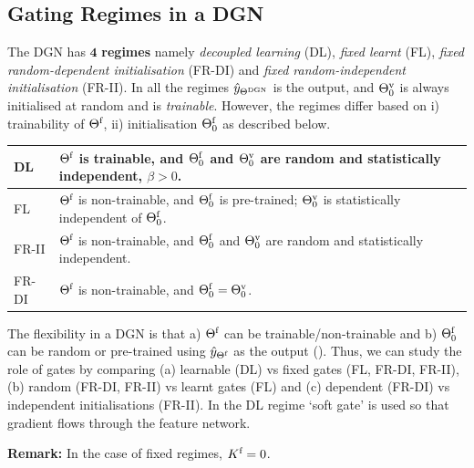 \subsection{Gating Regimes in a DGN}
\begin{definition}\label{def:regime}The DGN has $\mathbf{4}$ \textbf{regimes} namely \emph{decoupled learning} (DL), \emph{fixed learnt} (FL), \emph{fixed random-dependent initialisation} (FR-DI) and \emph{fixed random-independent initialisation} (FR-II). 
In all the regimes $\hat{y}_{\Theta^{\text{DGN}}}$ is the output, and ${\Theta}^{\text{v}}_0$ is always initialised at random and is \emph{trainable}. However, the regimes differ based on i) trainability of $\Theta^{\textrm{f}}$, ii) initialisation $\Theta^{\textrm{f}}_0$ as described below.\\
\begin{tabular}{|l|p{6cm}|}\hline
DL               & $\Theta^{\textrm{f}}$ is trainable, and $\Theta^{\textrm{f}}_0$ and ${\Theta}^{\text{v}}_0$ are random and statistically independent,  $\beta>0$.\\\hline
FL               & $\Theta^{\textrm{f}}$ is non-trainable, and $\Theta^{\textrm{f}}_0$ is pre-trained;  ${\Theta}^{\text{v}}_0$ is statistically independent of $\Theta^{\textrm{f}}_0$. \\\hline
FR-II            & $\Theta^{\textrm{f}}$ is non-trainable, and $\Theta^{\textrm{f}}_0$ and ${\Theta}^{\text{v}}_0$ are random and statistically independent.\\\hline
FR-DI   &  $\Theta^{\textrm{f}}$ is non-trainable, and $\Theta^{\textrm{f}}_0={\Theta}^{\text{v}}_0$.\\\hline
\end{tabular}
\end{definition}
The flexibility in a DGN is that  a) $\Theta^{\textrm{f}}$ can be trainable/non-trainable and b) $\Theta^{\textrm{f}}_0$ can be random or pre-trained using $\hat{y}_{{\Theta}^{\text{f}}}$ as the output (). Thus, we can study the role of gates by comparing (a) learnable (DL) vs fixed gates (FL, FR-DI, FR-II), (b) random (FR-DI, FR-II) vs learnt gates (FL) and (c) dependent (FR-DI) vs independent initialisations (FR-II). In the DL regime `soft gate' is used so that gradient flows through the feature network.

\textbf{Remark:} In the case of fixed regimes, $K^{\text{f}}=0$. 
